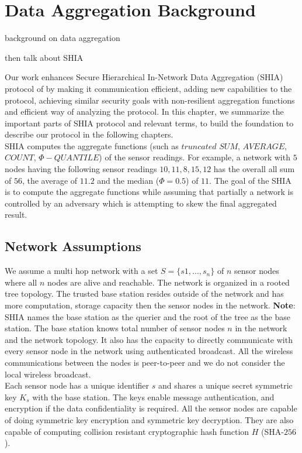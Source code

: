 \chapter{Data Aggregation Background} %
\label{cha:Data Aggregation Background}

background on data aggregation

then talk about SHIA

Our work enhances Secure Hierarchical In-Network Data Aggregation (SHIA) protocol of \cite{chan2006secure} by making it communication efficient, adding new capabilities to the protocol, achieving similar security goals with non-resilient aggregation functions and efficient way of analyzing the protocol.
In this chapter, we summarize the important parts of SHIA protocol and relevant terms, to build the foundation to describe our protocol in the following chapters.\\
SHIA computes the aggregate functions (such as $\textit{truncated SUM}$, $\textit{AVERAGE}$, $\textit{COUNT}$, $\Phi-QUANTILE$) of the sensor readings.
For example, a network with $5$ nodes having the following sensor readings $10,11,8,15,12$ has the overall all sum of $56$, the average of $11.2$ and the median ($\Phi = 0.5$) of $11$.
The goal of the SHIA is to compute the aggregate functions while assuming that partially a network is controlled by an adversary which is attempting to skew the final aggregated result.

\section{Network Assumptions}
	We assume a multi hop network with a set $ S = \{s1,...,s_{n}\} $ of $n$ sensor nodes where all $n$ nodes are alive and reachable. 
	The network is organized in a rooted tree topology.
	The trusted base station resides outside of the network and has more computation, storage capacity then the sensor nodes in the network. 
	\textbf{Note}: SHIA names the base station as the querier and the root of the tree as the base station. 
	The base station knows total number of sensor nodes $n$ in the network and the network topology. 
	It also has the capacity to directly communicate with every sensor node in the network using authenticated broadcast.
	All the wireless communications between the nodes is peer-to-peer and we do not consider the local wireless broadcast.\\
	Each sensor node has a unique identifier $s$ and shares a unique secret symmetric key $K_{s}$ with the base station.
	The keys enable message authentication, and encryption if the data confidentiality is required.
	All the sensor nodes are capable of doing symmetric key encryption and symmetric key decryption.
	They are also capable of computing collision resistant cryptographic hash function $H$ (SHA-$256$)\cite{SHA256}. 

